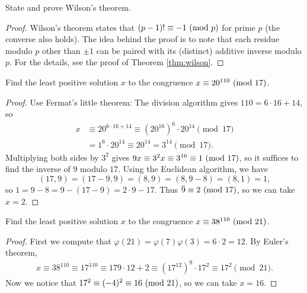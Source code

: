 \begin{exercise}
  State and prove Wilson's theorem.
\end{exercise}

\begin{proof}
  Wilson's theorem states
  that $(p - 1)! \equiv -1 \ (\mathrm{mod}\ p)$
  for prime $p$ (the converse also holds).
  The idea behind the
  proof is to note that each residue
  modulo $p$
  other than $\pm 1$ can be paired with
  its (distinct) additive
  inverse modulo $p$.
  For the details, see the proof of
  Theorem \ref{thm:wilson}.
\end{proof}

\begin{exercise}
  Find the least positive solution
  $x$ to the congruence
  $x \equiv 20^{110} \ (\mathrm{mod}\ 17)$.
\end{exercise}

\begin{proof}
  Use Fermat's little theorem: The division
  algorithm gives
  $110 = 6 \cdot 16 + 14$, so
  \begin{align*}
    x
    &\equiv 20^{6 \cdot 16 + 14}
    \equiv (20^{16})^6 \cdot 20^{14}
    \pmod{17} \\
    &= 1^6 \cdot 20^{14}
    \equiv 20^{14}
    = 3^{14} \pmod{17}.
  \end{align*}
  Multiplying both sides by $3^2$ gives
  $9x \equiv 3^2 x \equiv 3^{16} \equiv 1 \ (\mathrm{mod}\ 17)$, so
  it suffices to find the inverse
  of $9$ modulo $17$. Using the
  Euclidean algorithm, we have
  \[
    (17, 9)
    = (17 - 9, 9) = (8, 9)
    = (8, 9 - 8) = (8, 1)
    = 1,
  \]
  so $1 = 9 - 8 = 9 - (17 - 9) = 2 \cdot 9 - 17$.
  Thus $\overline{9} \equiv 2 \ (\mathrm{mod}\ 17)$,
  so we can take $x = 2$.
\end{proof}

\begin{exercise}
  Find the least positive solution
  $x$ to the congruence
  $x \equiv 38^{110} \ (\mathrm{mod}\ 21)$.
\end{exercise}

\begin{proof}
  First we compute that
  $\varphi(21) = \varphi(7) \varphi(3) = 6 \cdot 2 = 12$.
  By Euler's theorem,
  \begin{align*}
    x \equiv 38^{110}
    \equiv 17^{110}
    \equiv 17{9 \cdot 12 + 2}
    \equiv (17^{12})^9 \cdot 17^2
    \equiv 17^2 \pmod{21}.
  \end{align*}
  Now we notice that
  $17^2 \equiv (-4)^2 \equiv 16 \ (\mathrm{mod}\ 21)$, so
  we can take $x = 16$.
\end{proof}

